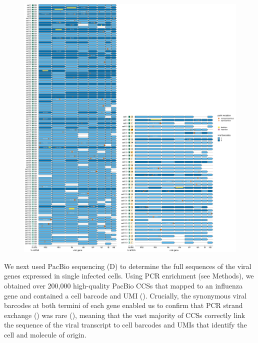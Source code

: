 \documentclass[9pt,lineno]{elife}
\begin{document}
\begin{figure}
\begin{fullwidth}
{\includegraphics[width=\textwidth]{figures/single_cell_figures/p_genotypes_by_ifn.pdf}}
\label{figsupp:genotypes_by_ifn}

\label{figdata:primer_sequences}

\label{figdata:genotypes}

\end{fullwidth}
\end{figure}

We next used PacBio sequencing (D) to determine the full sequences of the viral genes expressed in single infected cells.
Using PCR enrichment (see Methods), we obtained over 200,000 high-quality PacBio CCSs that mapped to an influenza gene and contained a cell barcode and UMI ().
Crucially, the synonymous viral barcodes at both termini of each gene enabled us to confirm that PCR strand exchange () was rare  (), meaning that the vast majority of CCSs correctly link the sequence of the viral transcript to cell barcodes and UMIs that identify the cell and molecule of origin.
\end{document}
